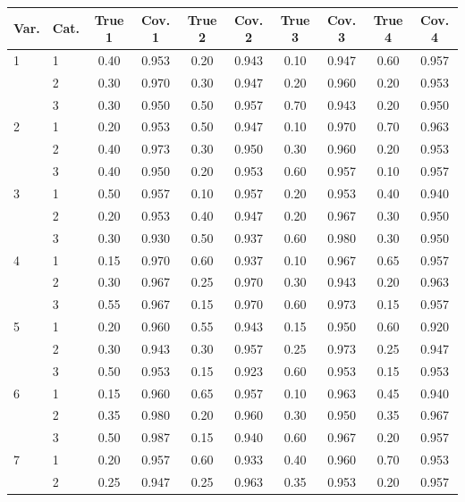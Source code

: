 \begin{longtable}{llcccccccc}
  \toprule
\textbf{Var.} & \textbf{Cat.} & \textbf{True 1} & \textbf{Cov. 1} & \textbf{True 2} & \textbf{Cov. 2} & \textbf{True 3} & \textbf{Cov. 3} & \textbf{True 4} & \textbf{Cov. 4} \\ 
  \midrule
1 & 1 & 0.40 & 0.953 & 0.20 & 0.943 & 0.10 & 0.947 & 0.60 & 0.957 \\ 
   & 2 & 0.30 & 0.970 & 0.30 & 0.947 & 0.20 & 0.960 & 0.20 & 0.953 \\ 
   & 3 & 0.30 & 0.950 & 0.50 & 0.957 & 0.70 & 0.943 & 0.20 & 0.950 \\ 
  2 & 1 & 0.20 & 0.953 & 0.50 & 0.947 & 0.10 & 0.970 & 0.70 & 0.963 \\ 
   & 2 & 0.40 & 0.973 & 0.30 & 0.950 & 0.30 & 0.960 & 0.20 & 0.953 \\ 
   & 3 & 0.40 & 0.950 & 0.20 & 0.953 & 0.60 & 0.957 & 0.10 & 0.957 \\ 
  3 & 1 & 0.50 & 0.957 & 0.10 & 0.957 & 0.20 & 0.953 & 0.40 & 0.940 \\ 
   & 2 & 0.20 & 0.953 & 0.40 & 0.947 & 0.20 & 0.967 & 0.30 & 0.950 \\ 
   & 3 & 0.30 & 0.930 & 0.50 & 0.937 & 0.60 & 0.980 & 0.30 & 0.950 \\ 
  4 & 1 & 0.15 & 0.970 & 0.60 & 0.937 & 0.10 & 0.967 & 0.65 & 0.957 \\ 
   & 2 & 0.30 & 0.967 & 0.25 & 0.970 & 0.30 & 0.943 & 0.20 & 0.963 \\ 
   & 3 & 0.55 & 0.967 & 0.15 & 0.970 & 0.60 & 0.973 & 0.15 & 0.957 \\ 
  5 & 1 & 0.20 & 0.960 & 0.55 & 0.943 & 0.15 & 0.950 & 0.60 & 0.920 \\ 
   & 2 & 0.30 & 0.943 & 0.30 & 0.957 & 0.25 & 0.973 & 0.25 & 0.947 \\ 
   & 3 & 0.50 & 0.953 & 0.15 & 0.923 & 0.60 & 0.953 & 0.15 & 0.953 \\ 
  6 & 1 & 0.15 & 0.960 & 0.65 & 0.957 & 0.10 & 0.963 & 0.45 & 0.940 \\ 
   & 2 & 0.35 & 0.980 & 0.20 & 0.960 & 0.30 & 0.950 & 0.35 & 0.967 \\ 
   & 3 & 0.50 & 0.987 & 0.15 & 0.940 & 0.60 & 0.967 & 0.20 & 0.957 \\ 
  7 & 1 & 0.20 & 0.957 & 0.60 & 0.933 & 0.40 & 0.960 & 0.70 & 0.953 \\ 
   & 2 & 0.25 & 0.947 & 0.25 & 0.963 & 0.35 & 0.953 & 0.20 & 0.957 \\ 

\end{longtable}
